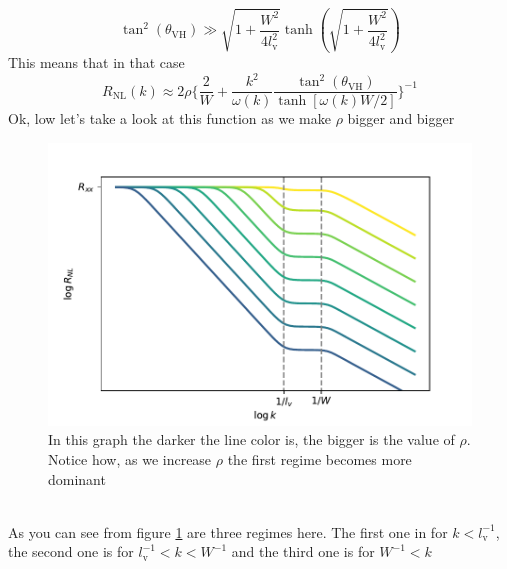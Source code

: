 \begin{equation}
    \tan^2(\theta_{\textrm{VH}})\gg \sqrt{1+\frac {W^2}{4l_{\textrm{v}}^2}}\tanh\left(\sqrt{1+\frac {W^2}{4l_{\textrm{v}}^2}}\right)
    \label{eq:highrhocond}
\end{equation}
This means that in that case
\begin{equation}
     R_{\textrm{NL}}(k)\approx 2\rho
    \bigg\{
        \frac 2W+ \frac {k^2}{\omega(k)}\frac{\tan^2(\theta_{\textrm{VH}})}{\tanh[\omega(k)W/2]}    
    \bigg\}^{-1}
    \label{eq:rhotoinf}
\end{equation}
Ok, low let's take a look at this function as we make $\rho$ bigger and bigger
\begin{figure}[h!]
    \centering
    \includegraphics[width=\linewidth]{Immagini/rnl/rho2.pdf}
    \caption{In this graph the darker the line color is, the bigger is the value of $\rho$. Notice how, as we increase $\rho$ the first regime becomes more dominant}
    \label{fig:rho2}
\end{figure}\\

As you can see from figure \ref{fig:rho2} are three regimes here. The first one in for $k<l_{\textrm{v}}^{-1}$, the second one is for $l_{\textrm{v}}^{-1}<k<W^{-1}$ and the third one is for $W^{-1}<k$
